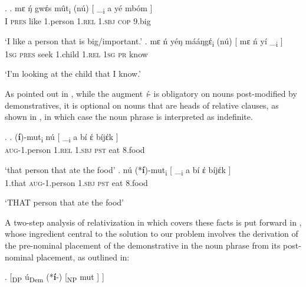 \ex. \citet[153--4]{Makasso2010}\label{Bas:big}
\ag. 
mɛ ŋ́ gwέs m\^ut\textsubscript{i} (n\'u)  [ \_\textsubscript{i}  a y\'e mb\'om ] \\
I \textsc{pres} like 1.person 1.\textsc{rel} {} {} 1.\textsc{sbj} \textsc{cop} 9.big\\
\strut `I like a person that is big/important.' 
\bg. 
mɛ \'n y\'eŋ m\'a\'aŋgέ\textsubscript{i} (n\'u) [ mɛ \'n y\'i \_\textsubscript{i} ]\\
\textsc{1sg} \textsc{pres} seek 1.child \textsc{1.rel} {} \textsc{1sg} \textsc{pr} know\\
\strut `I'm looking at the child that I know.' 

As pointed out in \citet{Makasso2010}, while the augment \textit{\'i}- is obligatory on nouns post-modified by demonstratives, it is optional on nouns that are heads of relative clauses, as shown in \Next, in which case the noun phrase is interpreted as indefinite.

\ex.
\ag.
(\textbf{\'i})-mut\textsubscript{i} n\'u [ \_\textsubscript{i} a b\'i έ b\'ijέk ]\\
\textsc{aug}-1.person 1.\textsc{rel} {} {} \textsc{1.sbj} \textsc{pst} eat 8.food {}\\
\strut `that person that ate the food'\label{RelC:i}
\bg.
n\'u (*\textbf{\'i})-mut\textsubscript{i} [ \_\textsubscript{i} a b\'i έ b\'ijέk ]\\
1.that \textsc{aug}-1.person {} {} \textsc{1.sbj} \textsc{pst} eat 8.food\\
\strut `THAT person that ate the food'\label{RelC:senza-i}


\noindent A two-step analysis of relativization in  which covers these facts is put forward in \cite{Jenks-etall}, whose ingredient central to the solution to our  problem involves the derivation of the pre-nominal placement of the demonstrative in the noun phrase from its post-nominal placement, as outlined in:



 \ex.\label{DFCF}
\setlength{\arrowht}{3ex}
\newcommand*\cgdepthstrut{{\vrule height 0pt depth \arrowht width 0pt}}
\renewcommand\eachwordone{\cgdepthstrut\rmfamily}
\renewcommand\glt{\vskip -\topsep}
\let\trans=\glt
\newcommand\arrowex{\setlength{\arrowht}{1ex}\ex}
[\textsubscript{DP} \'u\textsubscript{Dem} (*\textbf{\'i}-) [\textsubscript{NP} mut ]    ]


